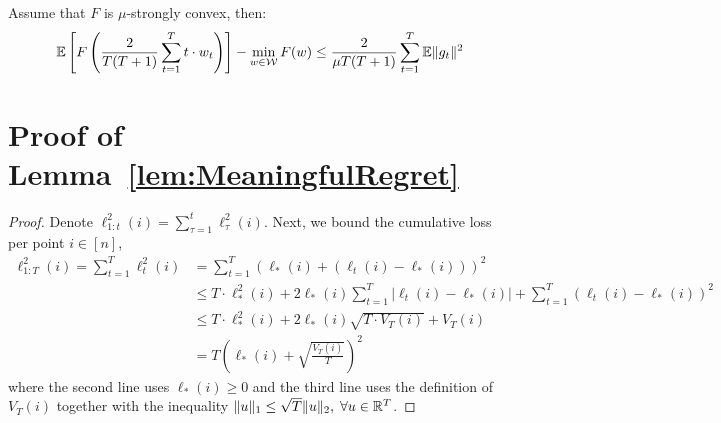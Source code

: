 \begin{theorem} Assume that $F$ is $\mu$-strongly convex, then:
\begin{equation*}
\mathbb{E}\left[ F\left(  \frac{2}{T(T+1)} \sum_{t=1}^T t\cdot w_t  \right)  \right] - \min_{w\in\mathcal{W}}F(w) \leq \frac{2}{\mu T(T+1)} \sum_{t=1}^T \mathbb{E}\|g_t\|^2
\end{equation*}
\end{theorem}


\section{Proof of Lemma~\ref{lem:MeaningfulRegret}}
\begin{proof}%
Denote $\ell^2_{1:t}(i) = \sum_{\tau=1}^t \ell_\tau^2(i)$.
Next, we bound the  cumulative  loss per point $i\in[n]$,
 \begin{align} \label{eq:SumeLL}
  \ell_{1:T}^2(i)= \sum_{t=1}^T {\ell_t^2(i)} 
& =  \sum_{t=1}^T {\left(\ell_*(i) + \left(\ell_t(i)-\ell_*(i)\right) \right)^2}   \nonumber\\
&\leq T\cdot \ell_{*}^2(i) + 2\ell_{*}(i)\sum_{t=1}^T|\ell_t(i) - \ell_{*}(i)| + \sum_{t=1}^T(\ell_t(i) - \ell_{*}(i))^2 \nonumber\\
&\leq T\cdot \ell_{*}^2(i) + 2\ell_{*}(i)\sqrt{T\cdot V_T(i)} +V_T(i)  \nonumber\\
&=T\left(\ell_{*}(i) +   \sqrt{\frac{V_T(i)}{T}} \right)^2
\end{align}
where the second line uses $\ell_*(i)\geq 0$ and the third line uses the definition of $V_T(i)$ together with the inequality
$\|u\|_1\leq \sqrt{T}\|u\|_2,\; \forall u\in {\mathbb R}^T$.


\end{proof}
